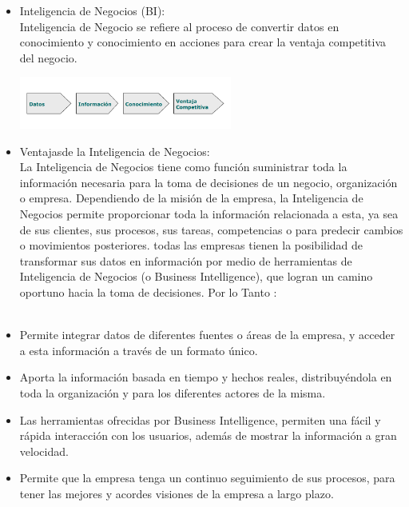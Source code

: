 \documentclass[twoside,twocolumn]{article}
\begin{document}
\begin{itemize}
\item Inteligencia de Negocios (BI): \\ 
Inteligencia de Negocio se refiere al proceso de
convertir datos en conocimiento y conocimiento en
acciones para crear la ventaja competitiva del
negocio. 
\begin{center}
	\includegraphics[width=7cm]{./Imagenes/bi} 
\end{center}

\item Ventajasde la Inteligencia de Negocios: \\
La Inteligencia de Negocios
tiene como función suministrar toda la información necesaria para la toma de
decisiones de un negocio, organización o empresa. Dependiendo de la misión de
la empresa, la Inteligencia de Negocios permite proporcionar toda la información
relacionada a esta, ya sea de sus clientes, sus procesos, sus tareas,
competencias o para predecir cambios o movimientos posteriores. 
todas las empresas tienen la posibilidad de
transformar sus datos en información por medio de herramientas de Inteligencia
de Negocios (o Business Intelligence), que logran un camino oportuno hacia la
toma de decisiones. Por lo Tanto : \\ \\ 


	\item Permite integrar datos de diferentes fuentes o áreas de la empresa, y acceder
a esta información a través de un formato único. \\
  
	\item Aporta la información basada en tiempo y hechos reales, distribuyéndola en
toda la organización y para los diferentes actores de la misma. \\


	\item Las herramientas ofrecidas por Business Intelligence, permiten una fácil y
rápida interacción con los usuarios, además de mostrar la información a gran
velocidad. \\

	\item Permite que la empresa tenga un continuo seguimiento de sus procesos, para
tener las mejores y acordes visiones de la empresa a largo plazo.\\



\end{itemize}
\end{document}
